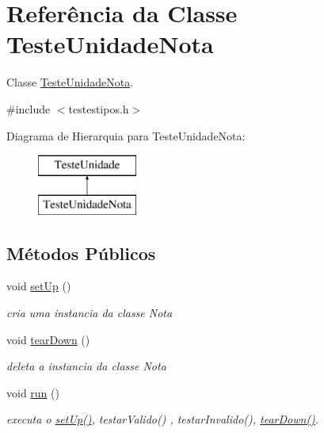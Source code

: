 \hypertarget{class_teste_unidade_nota}{
\section{\-Referência da \-Classe \-Teste\-Unidade\-Nota}
\label{class_teste_unidade_nota}
}


\-Classe \hyperlink{class_teste_unidade_nota}{\-Teste\-Unidade\-Nota}.  




{\ttfamily \#include $<$testestipos.\-h$>$}

\-Diagrama de \-Hierarquia para \-Teste\-Unidade\-Nota\-:\begin{figure}[H]
\begin{center}
\leavevmode
\includegraphics[height=2.000000cm]{class_teste_unidade_nota}
\end{center}
\end{figure}
\subsection*{\-Métodos \-Públicos}
\begin{DoxyCompactItemize}
\item 
\hypertarget{class_teste_unidade_nota_a152acba800d4faff31e1f4a8b9126c4b}{
void \hyperlink{class_teste_unidade_nota_a152acba800d4faff31e1f4a8b9126c4b}{set\-Up} ()}
\label{class_teste_unidade_nota_a152acba800d4faff31e1f4a8b9126c4b}

\begin{DoxyCompactList}\small\item\em cria uma instancia da classe \-Nota \end{DoxyCompactList}\item 
\hypertarget{class_teste_unidade_nota_a13e06cf32e7c61b3db4849b26a2c2926}{
void \hyperlink{class_teste_unidade_nota_a13e06cf32e7c61b3db4849b26a2c2926}{tear\-Down} ()}
\label{class_teste_unidade_nota_a13e06cf32e7c61b3db4849b26a2c2926}

\begin{DoxyCompactList}\small\item\em deleta a instancia da classe \-Nota \end{DoxyCompactList}\item 
\hypertarget{class_teste_unidade_nota_a7364d87fd0c80a9b2064a76eaea8b923}{
void \hyperlink{class_teste_unidade_nota_a7364d87fd0c80a9b2064a76eaea8b923}{run} ()}
\label{class_teste_unidade_nota_a7364d87fd0c80a9b2064a76eaea8b923}

\begin{DoxyCompactList}\small\item\em executa o \hyperlink{class_teste_unidade_nota_a152acba800d4faff31e1f4a8b9126c4b}{set\-Up()}, testar\-Valido() , testar\-Invalido(), \hyperlink{class_teste_unidade_nota_a13e06cf32e7c61b3db4849b26a2c2926}{tear\-Down()}. \end{DoxyCompactList}\end{DoxyCompactItemize}


